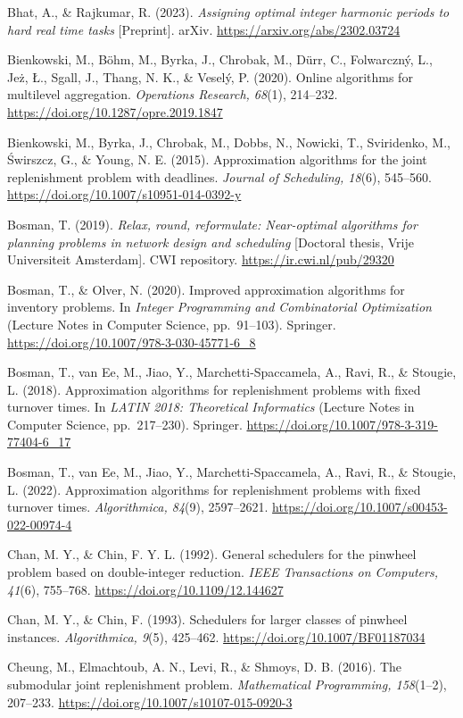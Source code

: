 \documentclass[
  british,
  11pt,
  a4paper,
]{article}
\begin{document}
Bhat, A., \& Rajkumar, R. (2023). \emph{Assigning optimal integer
harmonic periods to hard real time tasks} {[}Preprint{]}. arXiv.
\url{https://arxiv.org/abs/2302.03724}

Bienkowski, M., Böhm, M., Byrka, J., Chrobak, M., Dürr, C., Folwarczný,
L., Jeż, Ł., Sgall, J., Thang, N. K., \& Veselý, P. (2020). Online
algorithms for multilevel aggregation. \emph{Operations Research,
68}(1), 214--232. \url{https://doi.org/10.1287/opre.2019.1847}

Bienkowski, M., Byrka, J., Chrobak, M., Dobbs, N., Nowicki, T.,
Sviridenko, M., Świrszcz, G., \& Young, N. E. (2015). Approximation
algorithms for the joint replenishment problem with deadlines.
\emph{Journal of Scheduling, 18}(6), 545--560.
\url{https://doi.org/10.1007/s10951-014-0392-y}

Bosman, T. (2019). \emph{Relax, round, reformulate: Near-optimal
algorithms for planning problems in network design and scheduling}
{[}Doctoral thesis, Vrije Universiteit Amsterdam{]}. CWI repository.
\url{https://ir.cwi.nl/pub/29320}

Bosman, T., \& Olver, N. (2020). Improved approximation algorithms for
inventory problems. In \emph{Integer Programming and Combinatorial
Optimization} (Lecture Notes in Computer Science, pp.~91--103).
Springer. \url{https://doi.org/10.1007/978-3-030-45771-6_8}

Bosman, T., van Ee, M., Jiao, Y., Marchetti-Spaccamela, A., Ravi, R., \&
Stougie, L. (2018). Approximation algorithms for replenishment problems
with fixed turnover times. In \emph{LATIN 2018: Theoretical Informatics}
(Lecture Notes in Computer Science, pp.~217--230). Springer.
\url{https://doi.org/10.1007/978-3-319-77404-6_17}

Bosman, T., van Ee, M., Jiao, Y., Marchetti-Spaccamela, A., Ravi, R., \&
Stougie, L. (2022). Approximation algorithms for replenishment problems
with fixed turnover times. \emph{Algorithmica, 84}(9), 2597--2621.
\url{https://doi.org/10.1007/s00453-022-00974-4}

Chan, M. Y., \& Chin, F. Y. L. (1992). General schedulers for the
pinwheel problem based on double-integer reduction. \emph{IEEE
Transactions on Computers, 41}(6), 755--768.
\url{https://doi.org/10.1109/12.144627}

Chan, M. Y., \& Chin, F. (1993). Schedulers for larger classes of
pinwheel instances. \emph{Algorithmica, 9}(5), 425--462.
\url{https://doi.org/10.1007/BF01187034}

Cheung, M., Elmachtoub, A. N., Levi, R., \& Shmoys, D. B. (2016). The
submodular joint replenishment problem. \emph{Mathematical Programming,
158}(1--2), 207--233. \url{https://doi.org/10.1007/s10107-015-0920-3}
\end{document}
